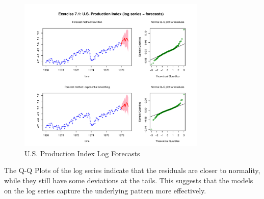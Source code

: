 \begin{figure}[H]
\centering
\includegraphics[width=0.8\textwidth]{plots/UsProdLogForecast.pdf}
\caption{U.S. Production Index Log Forecasts}
\end{figure}

The Q-Q Plots of the log series indicate that the residuals are closer to normality, while they still have some deviations at the tails. This suggests that the models on the log series capture the underlying pattern more effectively.